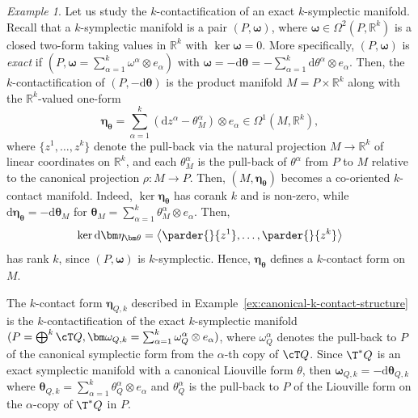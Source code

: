 \documentclass[11pt,a4paper]{article}
\newcommand{\dd}{\mathrm{d}}
\theoremstyle{plain} \newtheorem{theorem}{Theorem}[section] \newtheorem{proposition}[theorem]{Proposition} \newtheorem{corollary}[theorem]{Corollary} \newtheorem{lemma}[theorem]{Lemma} \theoremstyle{definition} \newtheorem{definition}[theorem]{Definition} \theoremstyle{remark} \newtheorem{remark}[theorem]{Remark} \newtheorem{example}[theorem]{Example} %
\begin{document}
\begin{example}\label{ex:contactification-k-symplectic-manifold}
Let us study the $k$-contactification of an exact $k$-symplectic manifold. Recall that a $k$-symplectic manifold is a pair $(P,\bm \omega)$, where $\bm \omega\in \Omega^2(P,\mathbb{R}^k)$ is a closed two-form taking values in $\mathbb{R}^k$ with $\ker \bm\omega=0$. More specifically, $(P,\bm \omega)$ is {\it exact} if $(P,\bm\omega = \sum_{\alpha=1}^k \omega^\alpha \otimes e_\alpha)$ with $\bm \omega = -\dd \bm\theta=-\sum_{\alpha=1}^k\dd \theta^\alpha\otimes e_\alpha$. Then, the $k$-contactification of $(P,-\dd\bm\theta)$ is the product manifold $M = P \times \mathbb{R}^k$ along with the 
$\mathbb{R}^k$-valued one-form
\[
\bm\eta_{\bm \theta} = \sum_{\alpha=1}^k ( \dd z^\alpha - \theta_M^\alpha)\otimes e_\alpha \in \Omega^1(M,\mathbb{R}^k),
\]
where $\{z^1,\ldots,z^k\}$ denote the pull-back  via the natural projection $M\rightarrow \mathbb{R}^k$ of linear coordinates on $\mathbb{R}^k$, and each $\theta_M^\alpha$ is the pull-back of $\theta^\alpha$ from $P$ to $M$ relative to the canonical projection $\rho:M\rightarrow P$. Then, $(M,\bm\eta_{\bm \theta})$ becomes a co-oriented $k$-contact manifold. Indeed, $\ker \bm\eta_{\bm \theta}$ has corank $k$ and is non-zero, while $\dd \bm\eta_{\bm \theta} = -\dd \bm\theta_M$ for $\bm \theta_M=\sum_{\alpha=1}^k\theta^\alpha_M\otimes e_\alpha$. Then,
\[
\ker \dd \bm\eta_{\bm\theta} = \left\langle \parder{}{z^1},\ldots,\parder{}{z^k} \right\rangle
\]
has rank $k$, since $(P,\bm\omega)$ is $k$-symplectic. Hence, $\bm\eta_{\bm \theta}$ defines a $k$-contact form on $M$.

The  $k$-contact form $\bm\eta_{Q,k}$ described in Example~\ref{ex:canonical-k-contact-structure} is  the $k$-contactification of the exact $k$-symplectic manifold $(P = \bigoplus^k \cT Q, \bm\omega_{Q,k}=\sum_{\alpha=1}^k \omega_{Q}^\alpha \otimes e_\alpha)$, where $\omega_{Q}^\alpha$ denotes the pull-back to $P$ of the canonical symplectic form from the $\alpha$-th copy of $\cT Q$. Since $\T^*Q$ is an exact symplectic manifold with a canonical Liouville form $\theta$, then $\bm\omega_{Q,k}=-\dd \bm\theta_{Q,k}$ where $\bm\theta_{Q,k} = \sum_{\alpha=1}^k \theta_Q^\alpha \otimes e_\alpha$ and $\theta^\alpha_Q$ is the pull-back to $P$ of the  Liouville form on the $\alpha$-copy of $\T^*Q$ in $P$.
\end{example}
\end{document}
